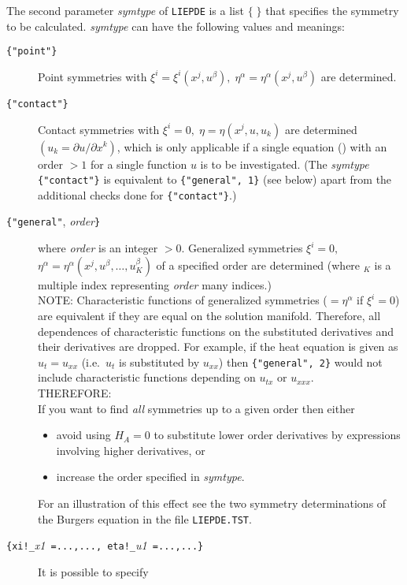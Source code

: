 The second parameter \textit{symtype} of \texttt{LIEPDE} is a list $\{\;\}$ that
specifies the symmetry to be calculated. \textit{symtype} can have the following
values and meanings:
\begin{description}
\item[\texttt{\{"point"\}}] Point symmetries with
  $\xi^i=\xi^i(x^j,u^{\beta}),\;
  \eta^{\alpha}=\eta^{\alpha}(x^j,u^{\beta})$ are determined.
\item[\texttt{\{"contact"\}}] Contact symmetries with
  $\xi^i=0,\;\eta=\eta(x^j,u,u_k)$ are determined $(u_k = \partial
  u/\partial x^k)$, which is only applicable if a single equation
  () with an order $>1$ for a single function $u$ is to be
  investigated.  (The \textit{symtype} \verb+{"contact"}+ is
  equivalent to \verb+{"general", 1}+ (see below) apart from the
  additional checks done for \verb+{"contact"}+.)
\item[\texttt{\{"general"}, \textit{order}\texttt{\}}] where \textit{order}
  is an integer $>0$.  Generalized symmetries $\xi^i=0,$
  $\eta^{\alpha}=\eta^{\alpha}(x^j,u^{\beta},\ldots,u^{\beta}_K)$ of a
  specified order are determined (where $_K$ is a multiple index
  representing \textit{order} many indices.) \\
  NOTE: Characteristic functions of generalized symmetries ($=
  \eta^{\alpha}$ if $\xi^i=0$) are equivalent if they are equal on the
  solution manifold.  Therefore, all dependences of characteristic
  functions on the substituted derivatives and their derivatives are
  dropped.  For example, if the heat equation is given as $u_t=u_{xx}$
  (i.e.\ $u_t$ is substituted by $u_{xx}$) then \verb+{"general", 2}+
  would not include characteristic functions depending on $u_{tx}$ or
  $u_{xxx}$. \\
  THEREFORE: \\
  If you want to find \textit{all} symmetries up to a given order then
  either
  \begin{itemize}
  \item avoid using $H_A=0$ to substitute lower order derivatives by
    expressions involving higher derivatives, or
  \item increase the order specified in \textit{symtype}.
  \end{itemize}
  For an illustration of this effect see the two symmetry
  determinations of the Burgers equation in the file \texttt{LIEPDE.TST}.
\item[\texttt{\{xi!\_}\textit{x1}\texttt{ =...,...,
    eta!\_}\textit{u1}\texttt{ =...,...\}}] It is possible to specify

\end{description}
